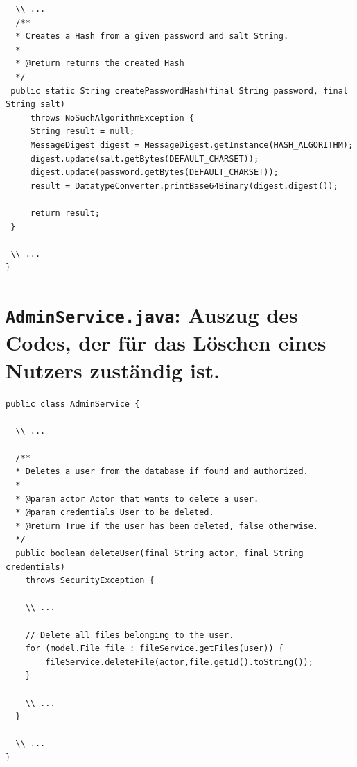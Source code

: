 \documentclass[12pt,DIV14,BCOR10mm,a4paper,parskip=half-,headsepline,headinclude,english,ngerman,bibliography=totocnumbered]{scrreprt}
\begin{document}
\begin{appendices}
\begin{lstlisting}
  \\ ...
  /**
  * Creates a Hash from a given password and salt String.
  *
  * @return returns the created Hash
  */
 public static String createPasswordHash(final String password, final String salt)
     throws NoSuchAlgorithmException {
     String result = null;
     MessageDigest digest = MessageDigest.getInstance(HASH_ALGORITHM);
     digest.update(salt.getBytes(DEFAULT_CHARSET));
     digest.update(password.getBytes(DEFAULT_CHARSET));
     result = DatatypeConverter.printBase64Binary(digest.digest());

     return result;
 }

 \\ ...
}
\end{lstlisting}

\section{\texttt{AdminService.java}: Auszug des Codes, der für das Löschen eines Nutzers zuständig ist.}

\label{delete-user-fail}
\begin{lstlisting}
public class AdminService {

  \\ ...

  /**
  * Deletes a user from the database if found and authorized.
  *
  * @param actor Actor that wants to delete a user.
  * @param credentials User to be deleted.
  * @return True if the user has been deleted, false otherwise.
  */
  public boolean deleteUser(final String actor, final String credentials)
    throws SecurityException {

    \\ ...

    // Delete all files belonging to the user.
    for (model.File file : fileService.getFiles(user)) {
        fileService.deleteFile(actor,file.getId().toString());
    }

    \\ ...
  }

  \\ ...
}
\end{lstlisting}

\end{appendices}
\end{document}
